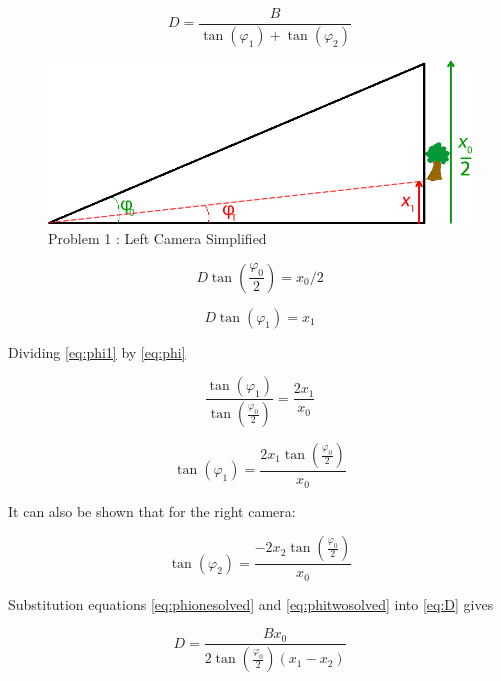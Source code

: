 \begin{equation} \label{eq:D}
D = \frac{B}{\tan(\varphi_{1}) + \tan(\varphi_{2})}
\end{equation}


\begin{figure}
\includegraphics[width=\textwidth,height=\textheight,keepaspectratio]{Figures/left_simplified.png}
\caption{Problem 1 : Left Camera Simplified}
\label{Left_Simplified}
\end{figure}

\begin{equation} \label{eq:phi}
D\tan(\frac{\varphi_{0}}{2}) = x_{0} / 2
\end{equation}

\begin{equation} \label{eq:phi1}
D\tan(\varphi_1) = x_1
\end{equation}

Dividing \eqref{eq:phi1} by \eqref{eq:phi}

\begin{equation} \label{eq:tanovertan}
\frac{\tan(\varphi_1)}{\tan(\frac{\varphi_0}{2})} = \frac{2x_1}{x_0}
\end{equation}

\begin{equation} \label{eq:phionesolved}
\tan(\varphi_1) = \frac{2x_1\tan(\frac{\varphi_0}{2})}{x_0}
\end{equation}

It can also be shown that for the right camera:

\begin{equation} \label{eq:phitwosolved}
\tan(\varphi_2) = \frac{-2x_2\tan(\frac{\varphi_0}{2})}{x_0}
\end{equation}

Substitution equations \eqref{eq:phionesolved} and \eqref{eq:phitwosolved} into \eqref{eq:D} gives

\begin{equation} \label{eq:Distance1}
D = \frac{Bx_0}{2\tan(\frac{\varphi_0}{2})(x_1 - x_2)}
\end{equation}


